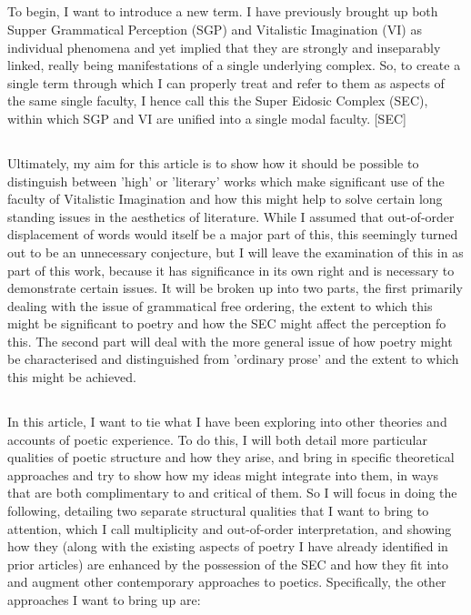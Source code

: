 \documentclass[]{article}
\begin{document}
\subsection{}


To begin, I want to introduce a new term. I have previously brought up both Supper Grammatical Perception (SGP) and Vitalistic Imagination (VI) as individual phenomena and yet implied that they are strongly and inseparably linked, really being manifestations of a single underlying complex. So, to create a single term through which I can properly treat and refer to them as aspects of the same single faculty, I hence call this the Super Eidosic Complex (SEC), within which SGP and VI are unified into a single modal faculty. [SEC]


\subsection{}



Ultimately, my aim for this article is to show how it should be possible to distinguish between 'high' or 'literary' works which make significant use of the faculty of Vitalistic Imagination and how this might help to solve certain long standing issues in the aesthetics of literature. While I assumed that out-of-order displacement of words would itself be a major part of this, this seemingly turned out to be an unnecessary conjecture, but I will leave the examination of this in as part of this work, because it has significance in its own right and is necessary to demonstrate certain issues. It will be broken up into two parts, the first primarily dealing with the issue of grammatical free ordering, the extent to which this might be significant to poetry and how the SEC might affect the perception fo this. The second part will deal with the more general issue of how poetry might be characterised and distinguished from 'ordinary prose' and the extent to which this might be achieved. \\


\subsection{}


In this article, I want to tie what I have been exploring into other theories and accounts of poetic experience. To do this, I will both detail more particular qualities of poetic structure and how they arise, and bring in specific theoretical approaches and try to show how my ideas might integrate into them, in ways that are both complimentary to and critical of them. So I will focus in doing the following, detailing two separate structural qualities that I want to bring to attention, which I call multiplicity and out-of-order interpretation, and showing how they (along with the existing aspects of poetry I have already identified in prior articles) are enhanced by the possession of the SEC and how they fit into and augment other contemporary approaches to poetics. Specifically, the other approaches I want to bring up are:
\end{document}
